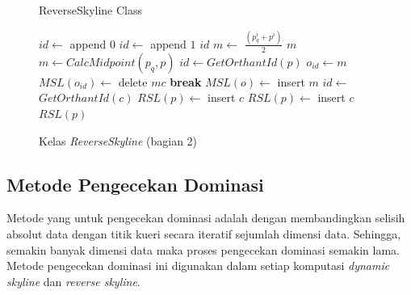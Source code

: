 \begin{figure}[H]
	\begin{algorithm}[H]
		\caption{ReverseSkyline Class}
		\begin{algorithmic}[1]
			 $id \leftarrow$ append $0$
			\Else {} $id \leftarrow$ append $1$
			\EndIf
			\EndFor
			\State \Return $id$
			\EndProcedure
			 $m \leftarrow$ $\frac{(p_q^i + p^i)}{2}$
			\EndFor
			\State \Return $m$
			\EndProcedure
			\State $m \leftarrow CalcMidpoint(p_q, p)$ 
			\State $id \leftarrow GetOrthantId(p)$
			 $o_{id} \leftarrow m$
			\Else{} 
			\State $MSL(o_{id}) \leftarrow$ delete $mc$
			\State \textbf{break} 
			\EndIf
			\EndFor
			\State $MSL(o) \leftarrow$ insert $m$
			\EndIf
			\EndIf
			\EndIf
			\EndFor
			\EndProcedure
			\State $id \leftarrow$ $GetOrthantId(c)$
			 $RSL(p) \leftarrow$ insert $c$
			\Else{}  
			\State $RSL(p) \leftarrow$ insert $c$
			\EndIf
			\EndIf
			\EndFor
			\State \Return $RSL(p)$
			\EndProcedure
		\end{algorithmic}
	\end{algorithm}
	\caption{Kelas \textit{ReverseSkyline} (bagian 2) \label{algo:rsl2}}
\end{figure}

\subsection{Metode Pengecekan Dominasi}

\tab Metode yang untuk pengecekan dominasi adalah dengan membandingkan selisih absolut data dengan titik kueri secara iteratif sejumlah dimensi data. Sehingga, semakin banyak dimensi data maka proses pengecekan dominasi semakin lama. Metode pengecekan dominasi ini digunakan dalam setiap komputasi \textit{dynamic skyline} dan \textit{reverse skyline}.

